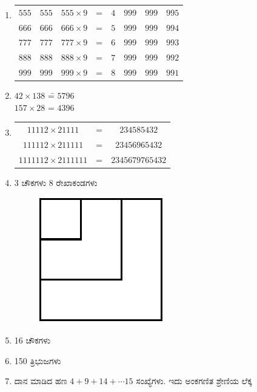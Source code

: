 \begin{enumerate}
\item 
\begin{tabular}[t]{llllllll}
$555$ & $555$ & $555\times 9$ & = & $4$ & $999$ & $999$ & $995$\\
$666$ & $666$ & $666\times 9$ & = & $5$ & $999$ & $999$ & $994$\\
$777$ & $777$ & $777\times 9$ & = & $6$ & $999$ & $999$ & $993$\\
$888$ & $888$ & $888\times 9$ & = & $7$ & $999$ & $999$ & $992$\\
$999$ & $999$ & $999\times 9$ & = & $8$ & $999$ & $999$ & $991$
\end{tabular}

\item 
\begin{tabbing}
$42\times 138$ \= =  $5796$\\
$157\times 28$ \> = $4396$
\end{tabbing}

\item 
\begin{tabular}[t]{ccc}
$11112\times 21111$ & = & $234585432$\\
$111112\times 211111$ & = & $23456965432$\\
$1111112\times 2111111$ & = & $2345679765432$
\end{tabular}



\item 3 ಚೌಕಗಳು 8 ರೇಖಾಕಂಡಗಳು 
\begin{figure}[H]
\centering
\includegraphics[scale=0.9]{images/chap8/ans18.eps}
\end{figure}


\item 16 ಚೌಕಗಳು 

\item 150 ತ್ರಿಭುಜಗಳು 

\item ದಾನ ಮಾಡಿದ ಹಣ $4 + 9 + 14 + \cdots 15$ ಸಂಖ್ಯೆಗಳು. ಇದು ಅಂಕಗಣಿತ ಶ್ರೇಣಿಯ ಲೆಕ್ಕ 


\end{enumerate}
